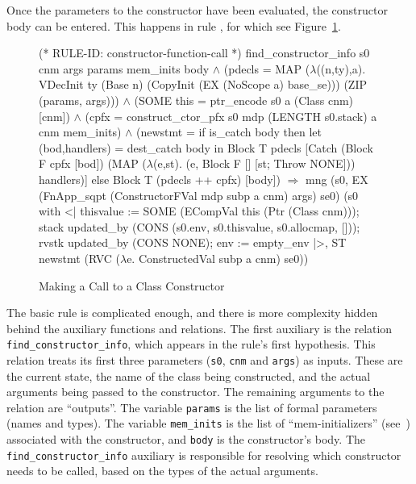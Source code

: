 \documentclass[11pt]{article}
\begin{document}
Once the parameters to the constructor have been evaluated, the
constructor body can be entered.%
%
This happens in rule , for which see
Figure~\ref{fig:constructor-function-call}.
\begin{figure}[htbp]
\begin{stdrule}
(* RULE-ID: constructor-function-call *)
     find_constructor_info s0 cnm args params mem_inits body \(\land\)
     (pdecls = MAP (\(\lambda\)((n,ty),a).
                        VDecInit ty (Base n)
                           (CopyInit (EX (NoScope a) base_se)))
                   (ZIP (params, args))) \(\land\)
     (SOME this = ptr_encode s0 a (Class cnm) [cnm]) \(\land\)
     (cpfx = construct_ctor_pfx s0 mdp (LENGTH s0.stack) a
                                cnm mem_inits) \(\land\)
     (newstmt =
        if is_catch body then
          let (bod,handlers) = dest_catch body
          in
            Block T pdecls
              [Catch (Block F cpfx [bod])
                     (MAP (\(\lambda\)(e,st).
                             (e, Block F [] [st; Throw NONE]))
                          handlers)]
        else Block T (pdecls ++ cpfx) [body])
   \(\Rightarrow\)
     mng (s0, EX (FnApp_sqpt (ConstructorFVal mdp subp a cnm)
                             args) se0)
         (s0 with <|
           thisvalue := SOME (ECompVal this (Ptr (Class cnm)));
           stack updated_by
                 (CONS (s0.env, s0.thisvalue, s0.allocmap, []));
           rvstk updated_by (CONS NONE);
           env := empty_env
          |>,
          ST newstmt (RVC (\(\lambda\)e. ConstructedVal subp a cnm)
                          se0))
\end{stdrule}
\caption{Making a Call to a Class Constructor}
\label{fig:constructor-function-call}
\end{figure}
The basic rule is complicated enough, and there is more complexity
hidden behind the auxiliary functions and relations.  The first
auxiliary is the relation \texttt{find_constructor_info}, which
appears in the rule's first hypothesis.  This relation treats its
first three parameters (\texttt{s0}, \texttt{cnm} and \texttt{args})
as inputs.  These are the current state, the name of the class being
constructed, and the actual arguments being passed to the constructor.
The remaining arguments to the relation are ``outputs''.  The variable
\texttt{params} is the list of formal parameters (names and types).
The variable \texttt{mem_inits} is the list of ``mem-initializers''
(see~\cite[\S12.6.2]{cpp-standard-iso14882}) associated with the
constructor, and \texttt{body} is the constructor's body.  The
\texttt{find_constructor_info} auxiliary is responsible for resolving
which constructor needs to be called, based on the types of the actual
arguments.
\end{document}
